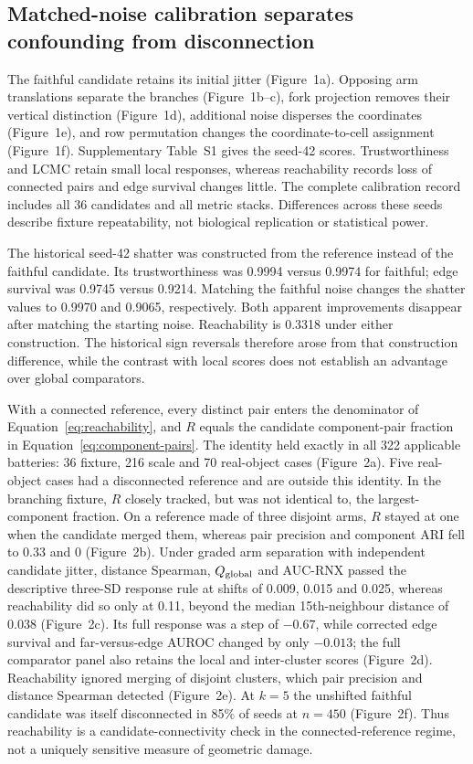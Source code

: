 \documentclass[11pt]{article}
\begin{document}
\subsection{Matched-noise calibration separates confounding from disconnection}

The faithful candidate retains its initial jitter (Figure~1a). Opposing arm translations separate the branches (Figure~1b--c), fork projection removes their vertical distinction (Figure~1d), additional noise disperses the coordinates (Figure~1e), and row permutation changes the coordinate-to-cell assignment (Figure~1f). Supplementary Table~S1 gives the seed-42 scores. Trustworthiness and LCMC retain small local responses, whereas reachability records loss of connected pairs and edge survival changes little. The complete calibration record includes all 36 candidates and all metric stacks. Differences across these seeds describe fixture repeatability, not biological replication or statistical power.





The historical seed-42 shatter was constructed from the reference instead of the faithful candidate. Its trustworthiness was 0.9994 versus 0.9974 for faithful; edge survival was 0.9745 versus 0.9214. Matching the faithful noise changes the shatter values to 0.9970 and 0.9065, respectively. Both apparent improvements disappear after matching the starting noise. Reachability is 0.3318 under either construction. The historical sign reversals therefore arose from that construction difference, while the contrast with local scores does not establish an advantage over global comparators.

With a connected reference, every distinct pair enters the denominator of Equation~\ref{eq:reachability}, and $R$ equals the candidate component-pair fraction in Equation~\ref{eq:component-pairs}. The identity held exactly in all 322 applicable batteries: 36 fixture, 216 scale and 70 real-object cases (Figure~2a). Five real-object cases had a disconnected reference and are outside this identity. In the branching fixture, $R$ closely tracked, but was not identical to, the largest-component fraction. On a reference made of three disjoint arms, $R$ stayed at one when the candidate merged them, whereas pair precision and component ARI fell to 0.33 and 0 (Figure~2b). Under graded arm separation with independent candidate jitter, distance Spearman, $Q_{\rm global}$ and AUC-RNX passed the descriptive three-SD response rule at shifts of 0.009, 0.015 and 0.025, whereas reachability did so only at 0.11, beyond the median 15th-neighbour distance of 0.038 (Figure~2c). Its full response was a step of $-0.67$, while corrected edge survival and far-versus-edge AUROC changed by only $-0.013$; the full comparator panel also retains the local and inter-cluster scores (Figure~2d). Reachability ignored merging of disjoint clusters, which pair precision and distance Spearman detected (Figure~2e). At $k=5$ the unshifted faithful candidate was itself disconnected in 85\% of seeds at $n=450$ (Figure~2f). Thus reachability is a candidate-connectivity check in the connected-reference regime, not a uniquely sensitive measure of geometric damage.
\end{document}
